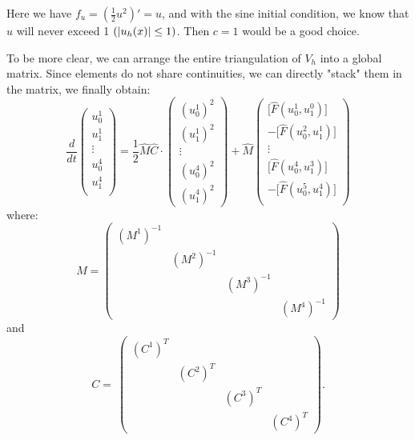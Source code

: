 \documentclass[12pt]{article} %
\newcommand{\1}[1]{\mathds{1}\left[#1\right]}
\begin{document}
Here we have $f_u = (\frac{1}{2}u^2)' = u$, and with the sine initial condition, we know that $u$ will never exceed 1 $(\abs{u_h(x)}\le 1)$. Then $c = 1$ would be a good choice. 

To be more clear, we can arrange the entire triangulation of $V_h$ into a global matrix. Since elements do not share continuities, we can directly "stack" them in the matrix, we finally obtain:
$$
	\frac{d}{dt} 
	\begin{pmatrix}
		u_0^1 \\
		u_1^1 \\
		\vdots \\
		u_0^4 \\
		u_1^4 \\
	\end{pmatrix} 
	= \frac12 \hat{M}\hat{C} \cdot
	\begin{pmatrix}
		(u_0^1)^2 \\
		(u_1^1)^2 \\
		\vdots \\
		(u_0^4)^2 \\
		(u_1^4)^2
	\end{pmatrix} +
	\hat{M}
	\begin{pmatrix}
		\big[\hat{F}(u_0^1, u_1^0)\big] \\
		-\big[\hat{F}(u_0^2, u_1^1)\big] \\
		\vdots \\
		\big[\hat{F}(u_0^4, u_1^3)\big] \\
		-\big[\hat{F}(u_0^5, u_1^4)\big] \\
	\end{pmatrix}
$$ where:
\[M =  \begin{pmatrix} (M^1)^{-1} & & & \\  &(M^2)^{-1}  & & \\ & & (M^3)^{-1} & \\  & & & (M^4)^{-1}  \end{pmatrix} \] and
\[C = \ \begin{pmatrix} (C^1)^T & & & \\  &(C^2)^T & & \\ & & (C^3)^T& \\  & & & (C^4)^T\end{pmatrix}.\]
\end{document}
